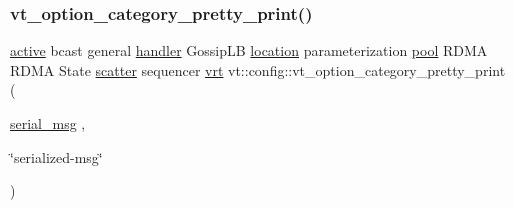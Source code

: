 \subsubsection{\texorpdfstring{vt\+\_\+option\+\_\+category\+\_\+pretty\+\_\+print()}{vt\_option\_category\_pretty\_print()}\hspace{0.1cm}{\footnotesize\ttfamily [13/16]}}
{\footnotesize\ttfamily \hyperlink{namespacevt_1_1config_a6bd1d6215bda0d8ca02811798399f689a82f77c67af0c363709010c6df4dbd920}{active} bcast general \hyperlink{namespacevt_1_1config_a6bd1d6215bda0d8ca02811798399f689a82a0081a94d5c5dfd18b0b3f7eca64b7}{handler} Gossip\+LB \hyperlink{namespacevt_1_1config_a6bd1d6215bda0d8ca02811798399f689aa8d8501591ca3859c828489054b17640}{location} parameterization \hyperlink{namespacevt_1_1config_a6bd1d6215bda0d8ca02811798399f689a50ba0efa092380eb92cee1d921d6e40f}{pool} R\+D\+MA R\+D\+MA State \hyperlink{namespacevt_1_1config_a6bd1d6215bda0d8ca02811798399f689ab0821d060501c20d94b8d700df7fdd76}{scatter} sequencer \hyperlink{namespacevt_1_1config_a6bd1d6215bda0d8ca02811798399f689a012d139c89a14e56a85f32fd82e7c7d3}{vrt} vt\+::config\+::vt\+\_\+option\+\_\+category\+\_\+pretty\+\_\+print (\begin{DoxyParamCaption}\item[{\hyperlink{namespacevt_1_1config_a6bd1d6215bda0d8ca02811798399f689a1a6250cbf239ae1424048d1e62f68d50}{serial\+\_\+msg}}]{,  }\item[{\char`\"{}serialized-\/msg\char`\"{}}]{ }\end{DoxyParamCaption})}

\mbox{\label{namespacevt_1_1config_ace9101caa6bac20ad7152ec818596452}} 
